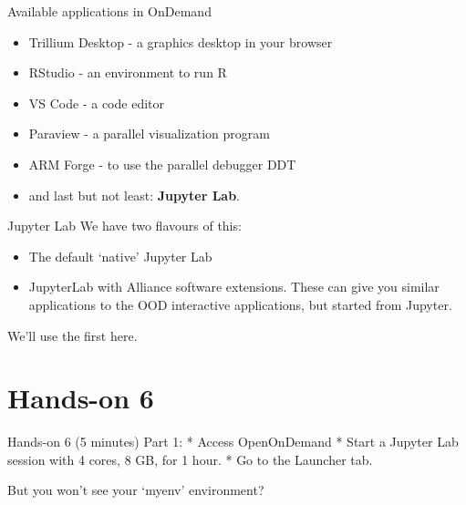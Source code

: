 \documentclass[
  10pt,
  ignorenonframetext,
  aspectratio=169,handout]{beamer}
\begin{document}
\begin{frame}{Available applications in OnDemand}
\label{available-applications-in-ondemand}
\begin{itemize}
\item
  Trillium Desktop - a graphics desktop in your browser

  \pause
\item
  RStudio - an environment to run R

  \pause
\item
  VS Code - a code editor

  \pause
\item
  Paraview - a parallel visualization program

  \pause
\item
  ARM Forge - to use the parallel debugger DDT

  \pause
\item
  and last but not least: \textbf{Jupyter Lab}.
\end{itemize}
\end{frame}

\begin{frame}{Jupyter Lab}
\label{jupyter-lab}
We have two flavours of this:

\begin{itemize}
\item
  The default `native' Jupyter Lab
\item
  JupyterLab with Alliance software extensions. These can give you similar applications to the OOD interactive applications, but started from Jupyter.
\end{itemize}

We'll use the first here.
\end{frame}

\section{Hands-on 6}\label{hands-on-6}

\begin{frame}{Hands-on 6 (5 minutes)}
\label{hands-on-6-5-minutes}
Part 1: * Access OpenOnDemand * Start a Jupyter Lab session with 4 cores, 8 GB, for 1 hour. * Go to the Launcher tab.

But you won't see your `myenv' environment?
\end{frame}
\end{document}
